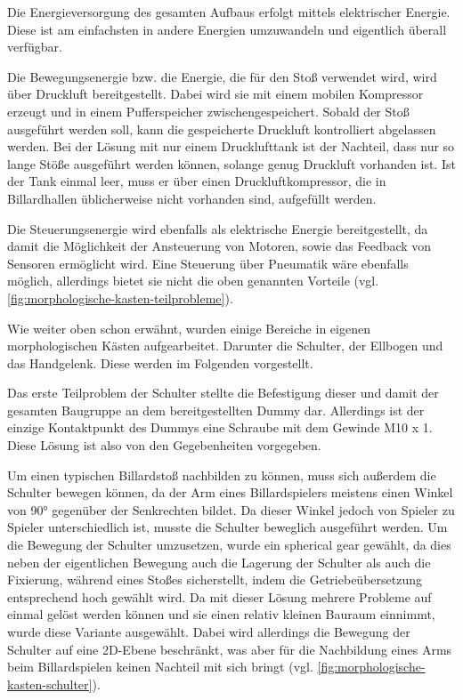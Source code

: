 		Die Energieversorgung des gesamten Aufbaus erfolgt mittels elektrischer Energie. Diese ist am einfachsten in andere Energien umzuwandeln und eigentlich überall verfügbar.\par\medskip

		Die Bewegungsenergie bzw. die Energie, die für den Stoß verwendet wird, wird über Druckluft bereitgestellt. Dabei wird sie mit einem mobilen Kompressor erzeugt und in einem Pufferspeicher zwischengespeichert. Sobald der Stoß ausgeführt werden soll, kann die gespeicherte Druckluft kontrolliert abgelassen werden. Bei der Lösung mit nur einem Drucklufttank ist der Nachteil, dass nur so lange Stöße ausgeführt werden können, solange genug Druckluft vorhanden ist. Ist der Tank einmal leer, muss er über einen Druckluftkompressor, die in Billardhallen üblicherweise nicht vorhanden sind, aufgefüllt werden.\par\medskip
		
		Die Steuerungsenergie wird ebenfalls als elektrische Energie bereitgestellt, da damit die Möglichkeit der Ansteuerung von Motoren, sowie das Feedback von Sensoren ermöglicht wird. Eine Steuerung über Pneumatik wäre ebenfalls möglich, allerdings bietet sie nicht die oben genannten Vorteile (vgl. \cref{fig:morphologische-kasten-teilprobleme}).\par\medskip
		
		Wie weiter oben schon erwähnt, wurden einige Bereiche in eigenen morphologischen Kästen aufgearbeitet. Darunter die Schulter, der Ellbogen und das Handgelenk. Diese werden im Folgenden vorgestellt.\par\medskip

		Das erste Teilproblem der Schulter stellte die Befestigung dieser und damit der gesamten Baugruppe an dem bereitgestellten Dummy dar. Allerdings ist der einzige Kontaktpunkt des Dummys eine Schraube mit dem Gewinde M10 x 1. Diese Lösung ist also von den Gegebenheiten vorgegeben.\par\medskip

		Um einen typischen Billardstoß nachbilden zu können, muss sich außerdem die Schulter bewegen können, da der Arm eines Billardspielers meistens einen Winkel von 90° gegenüber der Senkrechten bildet. Da dieser Winkel jedoch von Spieler zu Spieler unterschiedlich ist, musste die Schulter beweglich ausgeführt werden. Um die Bewegung der Schulter umzusetzen, wurde ein spherical gear gewählt, da dies neben der eigentlichen Bewegung auch die Lagerung der Schulter als auch die Fixierung, während eines Stoßes sicherstellt, indem die Getriebeübersetzung entsprechend hoch gewählt wird. Da mit dieser Lösung mehrere Probleme auf einmal gelöst werden können und sie einen relativ kleinen Bauraum einnimmt, wurde diese Variante ausgewählt. Dabei wird allerdings die Bewegung der Schulter auf eine 2D-Ebene beschränkt, was aber für die Nachbildung eines Arms beim Billardspielen keinen Nachteil mit sich bringt (vgl. \cref{fig:morphologische-kasten-schulter}).\par\medskip

